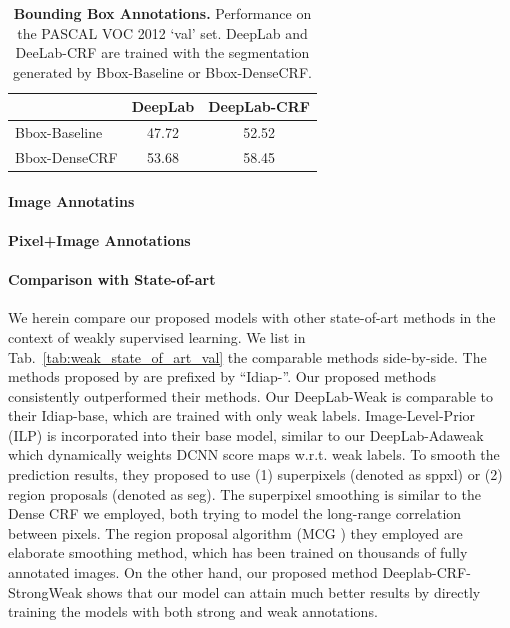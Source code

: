 \begin{table}
  \centering
  \caption{{\bf Bounding Box Annotations.} Performance on the PASCAL VOC 2012 `val' set. DeepLab and DeeLab-CRF are trained with the segmentation generated by Bbox-Baseline or Bbox-DenseCRF.}
  \begin{tabular}{| l | c | c |}
    \hline
     & DeepLab & DeepLab-CRF \\
    \hline
    Bbox-Baseline & 47.72 & 52.52 \\ 
    \hline
    Bbox-DenseCRF & 53.68 & 58.45 \\
    \hline
    \end{tabular}
  \label{tb:bbox_annot}
\end{table}

\paragraph{Image Annotatins} 

\paragraph{Pixel+Image Annotations}

\paragraph{Comparison with State-of-art} We herein compare our proposed models with other state-of-art methods in the context of weakly supervised learning. We list in Tab.~\ref{tab:weak_state_of_art_val} the comparable methods side-by-side. The methods proposed by \citet{pinheiro2014weakly} are prefixed by ``Idiap-''. Our proposed methods consistently outperformed their methods. Our DeepLab-Weak is comparable to their Idiap-base, which are trained with only weak labels. Image-Level-Prior (ILP) is incorporated into their base model, similar to our DeepLab-Adaweak which dynamically weights DCNN score maps w.r.t. weak labels. To smooth the prediction results, they proposed to use (1) superpixels (denoted as sppxl) or (2) region proposals (denoted as seg). The superpixel smoothing is similar to the Dense CRF we employed, both trying to model the long-range correlation between pixels. The region proposal algorithm (MCG \citep{arbelaez2014multiscale}) they employed are elaborate smoothing method, which has been trained on thousands of fully annotated images. On the other hand, our proposed method Deeplab-CRF-StrongWeak shows that our model can attain much better results by directly training the models with both strong and weak annotations.

